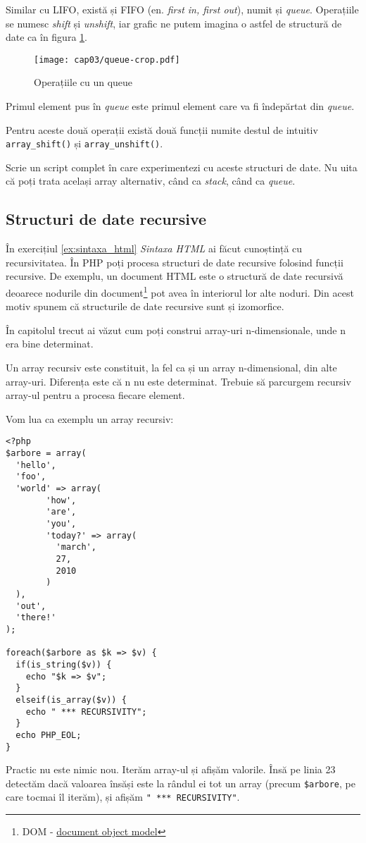 Similar cu LIFO, există și FIFO (en. \textsl{first in, first out}),
numit și \textsl{queue}. Operațiile se numesc \textsl{shift} și \textsl{unshift},
iar grafic ne putem imagina o astfel de structură de date ca în
figura \ref{fig:queue}.

\begin{figure}[ht!]
  \centering
    \texttt{[image: cap03/queue-crop.pdf]}
  \caption{Operațiile cu un queue}
  \label{fig:queue}
\end{figure}

Primul element pus în \textit{queue} este primul
element care va fi îndepărtat din \textsl{queue}.

Pentru aceste două operații există două funcții numite
destul de intuitiv \texttt{array\_shift()} și
\texttt{array\_unshift()}.



\begin{Exercise}[title={Experimentează cu stack și queue}]
Scrie un script complet în care experimentezi cu
aceste structuri de date. Nu uita că poți trata
același array alternativ, când ca \textit{stack}, când ca \textit{queue}.
\end{Exercise}

\subsection{Structuri de date recursive}
În exercițiul \ref{ex:sintaxa_html} \textit{Sintaxa HTML} ai
făcut cunoștință cu recursivitatea. În PHP poți procesa
structuri de date recursive folosind funcții recursive.
De exemplu,
un document HTML este o structură de date recursivă
deoarece nodurile din
document\footnote{DOM - \href{http://en.wikipedia.org/wiki/Document_Object_Model}{document object model}}
pot avea în interiorul lor alte noduri. Din acest motiv
spunem că structurile de date recursive sunt și izomorfice.

În capitolul trecut ai văzut cum poți construi array-uri
n-dimensionale, unde n era bine determinat.

Un array recursiv este constituit, la fel ca și un array
n-dimensional, din alte array-uri. Diferența este că
n nu este determinat. Trebuie să parcurgem recursiv
array-ul pentru a procesa fiecare element.


Vom lua ca exemplu un array recursiv:
\begin{lstlisting}
<?php
$arbore = array(
  'hello',
  'foo',
  'world' => array(
        'how',
        'are',
        'you',
        'today?' => array(
          'march',
          27,
          2010
        )
  ),
  'out',
  'there!'
);

foreach($arbore as $k => $v) {
  if(is_string($v)) {
	echo "$k => $v";
  }
  elseif(is_array($v)) {
	echo " *** RECURSIVITY";
  }
  echo PHP_EOL;
}
\end{lstlisting}
Practic nu este nimic nou. Iterăm array-ul și afișăm
valorile. Însă pe linia 23 detectăm dacă valoarea însăși
este la rândul ei tot un array (precum \texttt{\$arbore},
pe care tocmai îl iterăm), și afișăm \texttt{" *** RECURSIVITY"}.

